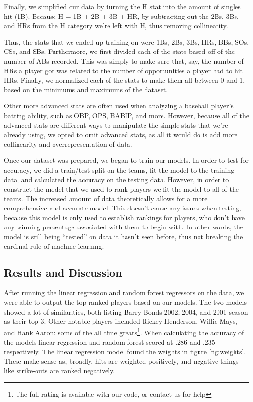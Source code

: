 \documentclass{article}
\begin{document}
Finally, we simplified our data by turning the H stat into the amount of singles hit (1B). Because H = 1B + 2B + 3B + HR, by subtracting out the 2Bs, 3Bs, and HRs from the H category we’re left with H, thus removing collinearity. 

Thus, the stats that we ended up training on were 1Bs, 2Bs, 3Bs, HRs, BBs, SOs, CSs, and SBs. Furthermore, we first divided each of the stats based off of the number of ABs recorded. This was simply to make sure that, say, the number of HRs a player got was related to the number of opportunities a player had to hit HRs. Finally, we normalized each of the stats to make them all between 0 and 1, based on the minimums and maximums of the dataset.

Other more advanced stats are often used when analyzing a baseball player’s batting ability, such as OBP, OPS, BABIP, and more. However, because all of the advanced stats are different ways to manipulate the simple stats that we’re already using, we opted to omit advanced stats, as all it would do is add more collinearity and overrepresentation of data.

Once our dataset was prepared, we began to train our models. In order to test for accuracy, we did a train/test split on the teams, fit the model to the training data, and calculated the accuracy on the testing data. However, in order to construct the model that we used to rank players we fit the model to all of the teams. The increased amount of data theoretically allows for a more comprehensive and accurate model. This doesn’t cause any issues when testing, because this model is only used to establish rankings for players, who don’t have any winning percentage associated with them to begin with. In other words, the model is still being “tested” on data it hasn’t seen before, thus not breaking the cardinal rule of machine learning.

    
    \subsection{Results and Discussion}
    \label{results1}
    
    After running the linear regression and random forest regressors on the data, we were able to output the top ranked players based on our models. The two models showed a lot of similarities, both listing Barry Bonds 2002, 2004, and 2001 season as their top 3. Other notable players included Rickey Henderson, Willie Mays, and Hank Aaron: some of the all time greats\footnote{The full rating is available with our code, or contact us for help}. When calculating the accuracy of the models linear regression and random forest scored at .286 and .235 respectively. The linear regression model found the weights in figure \ref{fig:weights}. These make sense as, broadly, hits are weighted positively, and negative things like strike-outs are ranked negatively.
    
\end{document}
